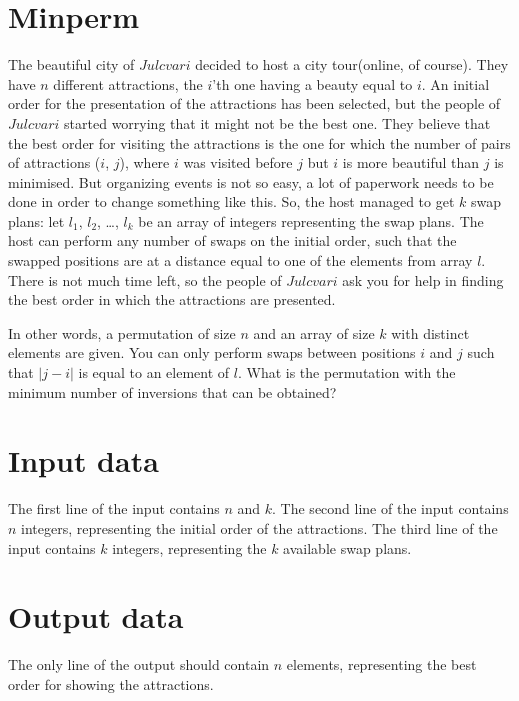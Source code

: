 \documentclass{article}
\title{}
\date{}
\begin{document}
\maketitle

\section*{Minperm}


    The beautiful city of $Julcvari$ decided to host a city tour(online, of course). They have $n$ different attractions, the $i$'th one having a beauty equal to $i$. An initial order for the presentation of the attractions has been selected, but the people of $Julcvari$ started worrying that it might not be the best one. They believe that the best order for visiting the attractions is the one for which the number of pairs of attractions ($i$, $j$), where $i$ was visited before $j$ but $i$ is more beautiful than $j$ is minimised. But organizing events is not so easy, a lot of paperwork needs to be done in order to change something like this. So, the host managed to get $k$ swap plans: let $l_1$, $l_2$, \ldots{}, $l_k$ be an array of integers representing the swap plans. The host can perform any number of swaps on the initial order, such that the swapped positions are at a distance equal to one of the elements from array $l$. There is not much time left, so the people of $Julcvari$ ask you for help in finding the best order in which the attractions are presented.
    
    
    In other words, a permutation of size $n$ and an array of size $k$ with distinct elements are given. You can only perform swaps between positions $i$ and $j$ such that $|j - i|$ is equal to an element of $l$. What is the permutation with the minimum number of inversions that can be obtained?

\section*{Input data}
The first line of the input contains $n$ and $k$.
The second line of the input contains $n$ integers, representing the initial order of the attractions.
The third line of the input contains $k$ integers, representing the $k$ available swap plans.
\section*{Output data}
The only line of the output should contain $n$ elements, representing the best order for showing the attractions.
\end{document}
